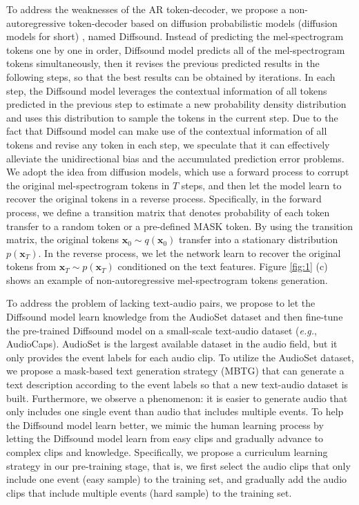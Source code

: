 \documentclass[lettersize,journal]{IEEEtran}
\begin{document}
To address the weaknesses of the AR token-decoder, we propose a non-autoregressive token-decoder based on diffusion probabilistic models (diffusion models for short) \cite{ho2020denoising,sohl2015deep,austin2021structured,gu2021vector}, named Diffsound. Instead of predicting the mel-spectrogram tokens one by one in order, Diffsound model predicts all of the mel-spectrogram tokens simultaneously, then it revises the previous predicted results in the following steps, so that the best results can be obtained by iterations. In each step, the Diffsound model leverages the contextual information of all tokens predicted in the previous step to estimate a new probability density distribution and uses this distribution to sample the tokens in the current step. Due to the fact that Diffsound model can make use of the contextual information of all tokens and revise any token in each step, we speculate that it can effectively alleviate  the unidirectional bias and the accumulated prediction error problems. We adopt the idea from diffusion models, which use a forward process to corrupt the original mel-spectrogram tokens in $T$ steps, and then let the model learn to recover the original tokens in a reverse process. Specifically, in the forward process, we define a transition matrix that denotes probability of each token transfer to a random token or a pre-defined MASK token. By using the transition matrix, the original tokens $\boldsymbol{x}_0 \sim q(\boldsymbol{x}_0)$ transfer into a stationary distribution $p(\boldsymbol{x}_T)$. In the reverse process, we let the network learn to recover the original tokens from $\boldsymbol{x}_T \sim p(\boldsymbol{x}_T)$ conditioned on the text features. Figure \ref{fig:1} (c) shows an example of non-autoregressive mel-spectrogram tokens generation.




{\color{black}To address the problem of lacking text-audio pairs,} we propose to let the Diffsound model learn knowledge from the AudioSet dataset \cite{gemmeke2017audio} and then fine-tune the pre-trained Diffsound model on a small-scale text-audio dataset (\textit{e.g.}, AudioCaps). AudioSet is the largest available dataset in the audio field, but it only provides the event labels for each audio clip. To utilize the AudioSet dataset, we propose a mask-based text generation strategy (MBTG) that can generate a text description according to the event labels so that a new text-audio dataset is built. Furthermore, we observe a phenomenon: it is easier to generate audio that only includes one single event than audio that includes multiple events. To help the Diffsound model learn better, we mimic the human learning process by letting the Diffsound model learn from easy {\color{black}clips} and gradually advance to complex clips and knowledge. Specifically, we propose a curriculum learning strategy in our pre-training stage, that is, we first select the {\color{black}audio clips} that only include one event (easy sample) to the training set, and gradually add the audio clips that include multiple events (hard sample) to the training set.  
\end{document}
